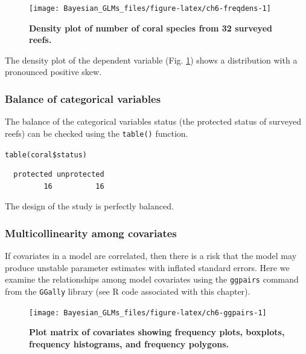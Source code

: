 \documentclass[
]{book}
\begin{document}
\begin{figure}

{\centering \texttt{[image: Bayesian\_GLMs\_files/figure-latex/ch6-freqdens-1]} 

}

\caption{\textbf{Density plot of number of coral species from 32 surveyed reefs.}}\label{fig:ch6-freqdens}
\end{figure}

The density plot of the dependent variable (Fig. \ref{fig:ch6-freqdens}) shows a distribution with a pronounced positive skew.

\hypertarget{nb-balance}{%
\subsubsection{Balance of categorical variables}\label{nb-balance}}

The balance of the categorical variables status (the protected status of surveyed reefs) can be checked using the \texttt{table()} function.

\texttt{table(coral\$status)}

\begin{verbatim}
  protected unprotected 
         16          16 
\end{verbatim}

The design of the study is perfectly balanced.

\hypertarget{nb-collin}{%
\subsubsection{Multicollinearity among covariates}\label{nb-collin}}

If covariates in a model are correlated, then there is a risk that the model may produce unstable parameter estimates with inflated standard errors. Here we examine the relationships among model covariates using the \texttt{ggpairs} command from the \texttt{GGally} library (see R code associated with this chapter).



\begin{figure}

{\centering \texttt{[image: Bayesian\_GLMs\_files/figure-latex/ch6-ggpairs-1]} 

}

\caption{\textbf{Plot matrix of covariates showing frequency plots, boxplots, frequency histograms, and frequency polygons.}}\label{fig:ch6-ggpairs}
\end{figure}
\end{document}
